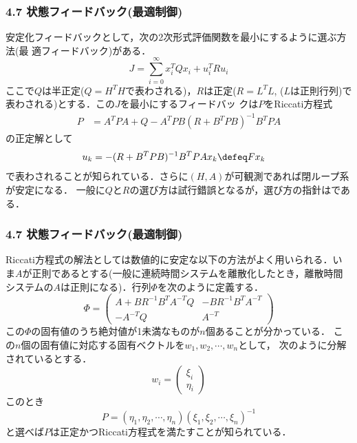 \begin{frame}[t]
\frametitle{4.7 状態フィードバック(最適制御)}
安定化フィードバックとして，次の2次形式評価関数を最小にするように選ぶ方法(最
適フィードバック)がある．
\begin{equation}
 J = \sum_{i=0}^{\infty} x_i^T Q x_i + u_i^T R u_i 
\end{equation}
ここで$Q$は半正定($Q = H^T H$で表わされる)，$R$は正定($R = L^T L$,
($L$は正則行列)で表わされる)とする．この$J$を最小にするフィードバッ
クは$P$をRiccati方程式
\begin{align}
 P   &= A^T P A + Q - A^T P B (R + B^T P B)^{-1} B^T P A
\end{align}
の正定解として
\begin{align}
 u_k &= - (R + B^T P B)^{-1} B^T P A x_k \defeq Fx_k
\end{align}
で表わされることが知られている．さらに$(H, A)$が可観測であれば閉ループ系
が安定になる．
一般に$Q$と$R$の選び方は試行錯誤となるが，選び方の指針はである．
\end{frame}

\begin{frame}[t]
\frametitle{4.7 状態フィードバック(最適制御)}
Riccati方程式の解法としては数値的に安定な以下の方法がよく用いられる．い
ま$A$が正則であるとする(一般に連続時間システムを離散化したとき，離散時間
システムの$A$は正則になる)．行列$\Phi$を次のように定義する．
\begin{equation}
 \Phi =
  \left(\begin{array}{cc}
         A + B R^{-1} B^T A^{-T} Q & - B R^{-1} B^T A^{-T}\\
	 - A^{-T} Q                &  A^{-T}
	\end{array}\right)
\end{equation}
この$\Phi$の固有値のうち絶対値が1未満なものが$n$個あることが分かっている．
この$n$個の固有値に対応する固有ベクトルを$w_1, w_2, \cdots, w_n$として，
次のように分解されているとする．
\begin{equation}
 w_i = \left(\begin{array}{c}
	      \xi_i \\
	      \eta_i
	     \end{array}\right)
\end{equation}
このとき
\begin{equation}
 P = (\eta_1, \eta_2,\cdots,\eta_n)(\xi_1,\xi_2,\cdots,\xi_n)^{-1}
\end{equation}
と選べば$P$は正定かつRiccati方程式を満たすことが知られている．
\end{frame}

